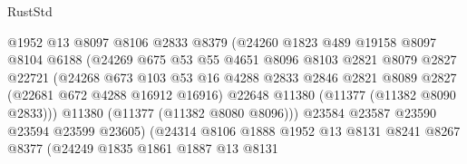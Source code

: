 \begin{lexlean}{RustStd}
\begin{coremodule}
                                @1952
                                @13
                                @8097
                                @8106
                                @2833
                                @8379
                                (@24260
                                  @1823
                                  @489
                                  @19158
                                  @8097
                                  @8104
                                  @6188
                                  (@24269
                                    @675
                                    @53
                                    @55
                                    @4651
                                    @8096
                                    @8103
                                    @2821
                                    @8079
                                    @2827
                                    @22721
                                    (@24268
                                      @673
                                      @103
                                      @53
                                      @16
                                      @4288
                                      @2833
                                      @2846
                                      @2821
                                      @8089
                                      @2827
                                      (@22681 @672 @4288 @16912 @16916)
                                      @22648
                                      @11380
                                      (@11377 (@11382 @8090 @2833)))
                                    @11380
                                    (@11377 (@11382 @8080 @8096)))
                                  @23584
                                  @23587
                                  @23590
                                  @23594
                                  @23599
                                  @23605)
                                (@24314
                                  @8106
                                  @1888
                                  @1952
                                  @13
                                  @8131
                                  @8241
                                  @8267
                                  @8377
                                  (@24249
                                    @1835
                                    @1861
                                    @1887
                                    @13
                                    @8131

\end{coremodule}
\end{lexlean}
